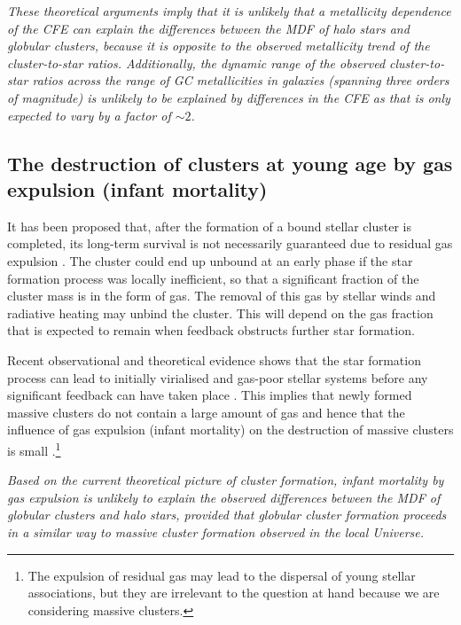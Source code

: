 \documentclass{aa}
\begin{document}
{\it These theoretical arguments imply that it is unlikely that a metallicity dependence of the CFE can explain the differences between the MDF of halo stars and globular clusters, because it is opposite to the observed metallicity trend of the cluster-to-star ratios. Additionally, the dynamic range of the observed cluster-to-star ratios across the range of GC metallicities in galaxies (spanning three orders of magnitude) is unlikely to be explained by differences in the CFE as that is only expected to vary by a factor of $\sim2$.}



\subsection{The destruction of clusters at young age by gas expulsion (infant mortality)} \label{sec:form:expulsion}


It has been proposed that, after the formation of a bound stellar cluster is completed, its long-term survival is not necessarily guaranteed due to residual gas expulsion \citep[e.g.][]{lada84,boily03,baumgardt07}. The cluster could end up unbound at an early phase if the star formation process was locally inefficient, so that a significant fraction of the cluster mass is in the form of gas. The removal of this gas by stellar winds and radiative heating may unbind the cluster. This will depend on the gas fraction 
that is expected to remain when feedback obstructs further star formation.

Recent observational and theoretical evidence shows that the star formation process can lead to initially virialised and gas-poor stellar systems before any significant feedback can have taken place \citep{kruijssen12,girichidis12b,cottaar12,longmore14}. This implies that newly formed massive clusters do not contain a large amount of gas and hence that the influence of gas expulsion (infant mortality) on the destruction of massive clusters is small \citep[cf.][]{longmore14}.\footnote{The expulsion of residual gas may lead to the dispersal of young stellar associations, but they are irrelevant to the question at hand because we are considering massive clusters.}

{\it Based on the current theoretical picture of cluster formation, infant mortality by gas expulsion is unlikely to explain the observed differences between the MDF of globular clusters and halo stars, provided that globular cluster formation proceeds in a similar way to massive cluster formation observed in the local Universe.}
\end{document}
